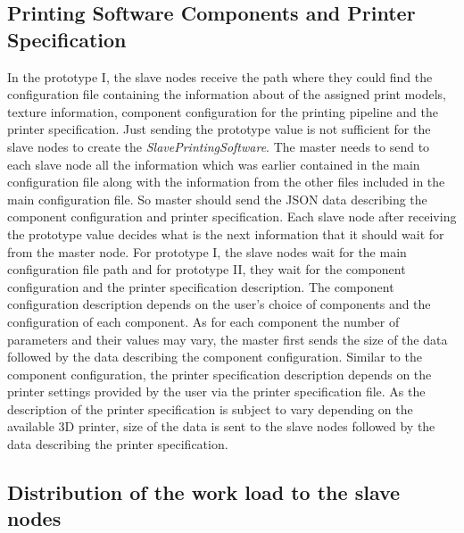 \subsection{Printing Software Components and Printer Specification}
In the prototype I, the slave nodes receive the path where they could find the configuration file containing the information about of the assigned print models, texture information, component configuration for the printing pipeline and the printer specification. Just sending the prototype value is not sufficient for the slave nodes to create the \textit{SlavePrintingSoftware}. The master needs to send to each slave node all the information which was earlier contained in the main configuration file along with the information from the other files included in the main configuration file. So master should send the JSON data describing the component configuration and printer specification. Each slave node after receiving the prototype value decides what is the next information that it should wait for from the master node. For prototype I, the slave nodes wait for the main configuration file path and for prototype II, they wait for the component configuration and the printer specification description. The component configuration description depends on the user's choice of components and the configuration of each component. As for each component the number of parameters and their values may vary, the master first sends the size of the data followed by the data describing the component configuration. Similar to the component configuration, the printer specification description depends on the printer settings provided by the user via the printer specification file. As the description of the printer specification is subject to vary depending on the available 3D printer, size of the data is sent to the slave nodes followed by the data describing the printer specification.\newline 

\subsection{Distribution of the work load to the slave nodes}

